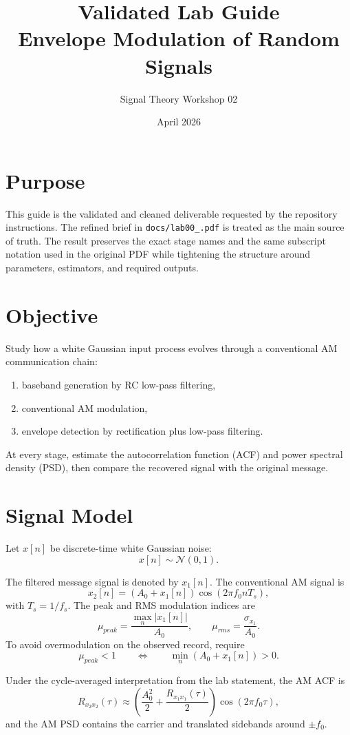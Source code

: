 \documentclass[11pt,a4paper]{article}
\title{Validated Lab Guide\\Envelope Modulation of Random Signals}
\author{Signal Theory Workshop 02}
\date{April 2026}
\begin{document}
\maketitle

\section*{Purpose}
This guide is the validated and cleaned deliverable requested by the repository
instructions. The refined brief in \texttt{docs/lab00\_.pdf} is treated as the
main source of truth. The result preserves the exact stage names and the same
subscript notation used in the original PDF while tightening the structure
around parameters, estimators, and required outputs.

\section*{Objective}
Study how a white Gaussian input process evolves through a conventional AM
communication chain:
\begin{enumerate}[leftmargin=1.5em]
  \item baseband generation by RC low-pass filtering,
  \item conventional AM modulation,
  \item envelope detection by rectification plus low-pass filtering.
\end{enumerate}

At every stage, estimate the autocorrelation function (ACF) and power spectral
density (PSD), then compare the recovered signal with the original message.

\section*{Signal Model}
Let $x[n]$ be discrete-time white Gaussian noise:
\[
  x[n] \sim \mathcal{N}(0,1).
\]

The filtered message signal is denoted by $x_1[n]$. The conventional AM signal
is
\[
  x_2[n] = (A_0 + x_1[n]) \cos(2\pi f_0 nT_s),
\]
with $T_s = 1/f_s$. The peak and RMS modulation indices are
\[
  \mu_{peak} = \frac{\max_n |x_1[n]|}{A_0},
  \qquad
  \mu_{rms} = \frac{\sigma_{x_1}}{A_0}.
\]
To avoid overmodulation on the observed record, require
\[
  \mu_{peak} < 1
  \qquad \Longleftrightarrow \qquad
  \min_n (A_0 + x_1[n]) > 0.
\]

Under the cycle-averaged interpretation from the lab statement, the AM ACF is
\[
  R_{x_2x_2}(\tau)
  \approx
  \left(
    \frac{A_0^2}{2}
    +
    \frac{R_{x_1x_1}(\tau)}{2}
  \right)
  \cos(2\pi f_0 \tau),
\]
and the AM PSD contains the carrier and translated sidebands around $\pm f_0$.
\end{document}
